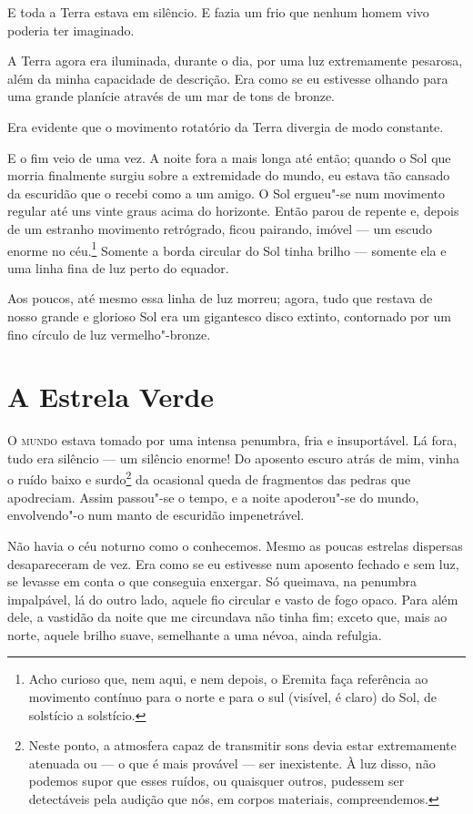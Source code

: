 E toda a Terra estava em silêncio. E fazia um frio que nenhum homem vivo poderia ter imaginado.

A Terra agora era iluminada, durante o dia, por uma luz extremamente pesarosa, além da minha capacidade de descrição. Era
como se eu estivesse olhando para uma grande planície através de um mar de tons de bronze.

Era evidente que o movimento rotatório da Terra divergia de modo constante.

E o fim veio de uma vez. A noite fora a mais longa até então; quando o Sol que morria finalmente surgiu sobre a
extremidade do mundo, eu estava tão cansado da escuridão que o recebi como a um amigo. O Sol ergueu"-se num movimento
regular até uns vinte graus acima do horizonte. Então parou de repente e, depois de um estranho movimento retrógrado,
ficou pairando, imóvel --- um escudo enorme no céu.\footnote{ Acho curioso que,
nem aqui, e nem depois, o Eremita faça referência ao movimento contínuo para o
norte e para o sul (visível, é claro) do Sol, de solstício a solstício.} 
Somente a borda circular do Sol tinha brilho --- somente ela e uma
linha fina de luz perto do equador.

Aos poucos, até mesmo essa linha de luz morreu; agora, tudo que restava de nosso grande e glorioso Sol era um
gigantesco disco extinto, contornado por um fino círculo de luz vermelho"-bronze.


\clearpage

\chapter{A Estrela Verde}

\textsc{O mundo} estava tomado por uma intensa penumbra, fria e insuportável. Lá fora, tudo era silêncio --- um silêncio
enorme! Do aposento escuro atrás de mim, vinha o ruído baixo e surdo\footnote{ Neste ponto, a atmosfera capaz de transmitir 
sons devia estar extremamente atenuada ou --- o que é mais provável ---
ser inexistente. À luz disso, não podemos supor que esses ruídos, ou quaisquer outros, pudessem ser detectáveis pela
audição que nós, em corpos materiais, compreendemos.} da ocasional queda de fragmentos das pedras
que apodreciam. Assim passou"-se o tempo, e a noite apoderou"-se do mundo, envolvendo"-o num manto de escuridão
impenetrável.

Não havia o céu noturno como o conhecemos. Mesmo as poucas estrelas dispersas desapareceram de vez. Era como se eu
estivesse num aposento fechado e sem luz, se levasse em conta o que conseguia enxergar. Só queimava, na penumbra
impalpável, lá do outro lado, aquele fio circular e vasto de fogo opaco. Para além dele, a vastidão da noite que me
circundava não tinha fim; exceto que, mais ao norte, aquele brilho suave, semelhante a uma névoa, ainda refulgia.

